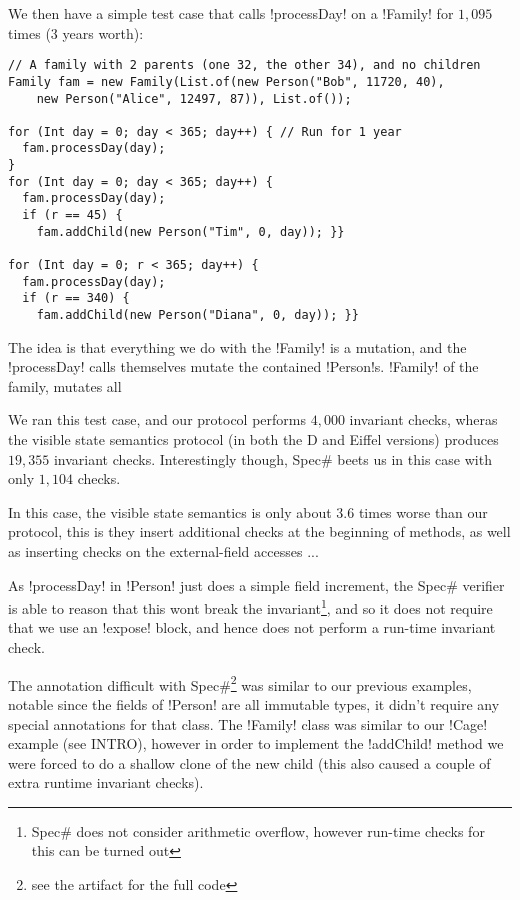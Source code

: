 We then have a simple test case that calls \Q!processDay! on a \Q!Family! for $1,095$ times (3 years worth):
\begin{lstlisting}
// A family with 2 parents (one 32, the other 34), and no children
Family fam = new Family(List.of(new Person("Bob", 11720, 40), 
    new Person("Alice", 12497, 87)), List.of());
    
for (Int day = 0; day < 365; day++) { // Run for 1 year
  fam.processDay(day);
}
for (Int day = 0; day < 365; day++) {
  fam.processDay(day);
  if (r == 45) {
    fam.addChild(new Person("Tim", 0, day)); }}

for (Int day = 0; r < 365; day++) {
  fam.processDay(day);
  if (r == 340) {
    fam.addChild(new Person("Diana", 0, day)); }}
\end{lstlisting}
The idea is that everything we do with the \Q!Family! is a mutation, and the \Q!processDay! calls themselves mutate the contained \Q!Person!s. \Q!Family! of the family, mutates all 

We ran this test case, and our protocol performs $4,000$ invariant checks, wheras the visible state semantics protocol (in both the D and Eiffel versions) produces $19,355$ invariant checks. Interestingly though, Spec\# beets us in this case with only $1,104$ checks.

In this case, the visible state semantics is only about $3.6$ times worse than our protocol, this is they insert additional checks at the beginning of methods, as well as inserting checks on the external-field accesses ...

As \Q!processDay! in \Q!Person! just does a simple field increment, the Spec\# verifier is able to reason that this wont break the invariant\footnote{Spec\# does not consider arithmetic overflow, however run-time checks for this can be turned out}, and so it does not require that we use an \Q!expose! block, and hence does not perform a run-time invariant check.

The annotation difficult with Spec\#\footnote{see the artifact for the full code} was similar to our previous examples, notable since the fields of \Q!Person! are all immutable types, it didn't require any special annotations for that class. The \Q!Family! class was similar to our \Q!Cage! example (see INTRO), however in order to implement the \Q!addChild! method we were forced to do a shallow clone of the new child (this also caused a couple of extra runtime invariant checks).
